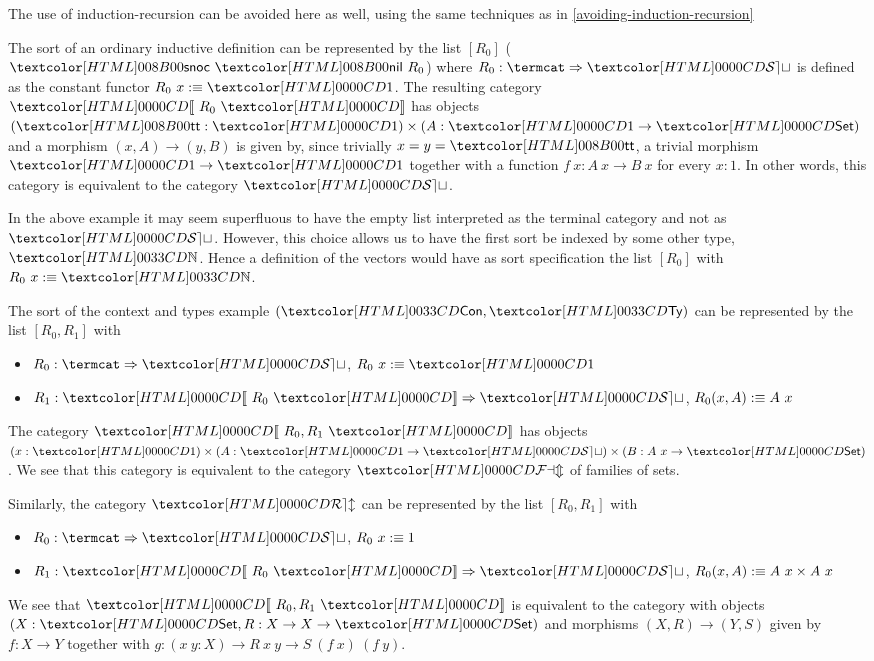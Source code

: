 \begin{remark}
  The use of induction-recursion can be avoided here as well, using
  the same techniques as in \cref{avoiding-induction-recursion}
\end{remark}

\begin{example}
  The sort of an ordinary inductive definition can be represented by
  the list $[R_0]$ (\ie $\sortssnoc\ \sortsnil\ R_0$) where
  $R_0 : \Func{\termcat}{\SET}$ is defined as the constant functor
  $R_0\ x \ddefeq \unitty$. The resulting category $\SortCat{R_0}$ has
  objects $(\unitval : \unitty) \times (A : \unitty \to \Set)$ and a
  morphism $(x, A) \to (y, B)$ is given by, since trivially
  $x = y = \unitval$, a trivial morphism $\unitty \to \unitty$
  together with a function $f\ x : A\ x \to B\ x$ for every $x : 1$. In
  other words, this category is equivalent to the category $\SET$.
\end{example}

In the above example it may seem superfluous to have the empty list
interpreted as the terminal category and not as $\SET$. However, this
choice allows us to have the first sort be indexed by some other type,
\eg $\natty$. Hence a definition of the vectors would have as sort
specification the list $[R_0]$ with $R_0\ x \ddefeq \natty$.

\begin{example}
  The sort of the context and types example $(\ttconty, \tttyty)$ can be
  represented by the list $[R_0, R_1]$ with
  \begin{itemize}
  \item $R_0 : \Func{\termcat}{\SET}$, $R_0\ x \ddefeq \unitty$
  \item $R_1 : \Func{\SortCat{R_0}}{\SET}$, $R_0 (x, A) :\equiv A\ x$
  \end{itemize}
  The category $\SortCat{R_0,R_1}$ has objects
  $(x : \unitty) \times (A : \unitty \to \SET) \times (B : A\ x \to
  \Set)$.
  We see that this category is equivalent to the category $\FAM$ of
  families of sets.
\end{example}

\begin{example}
  \label{rel-sorts}
  Similarly, the category $\REL$ can be represented by the list
  $[R_0, R_1]$ with
  \begin{itemize}
  \item $R_0 : \Func{\termcat}{\SET}$, $R_0\ x :\equiv 1$
  \item $R_1 : \Func{\SortCat{R_0}}{\SET}$, $R_0 (x, A) :\equiv A\ x \times A\ x$
  \end{itemize}
  We see that $\SortCat{R_0,R_1}$ is equivalent to the category with
  objects $(X : \Set, R : X \to X \to \Set)$ and morphisms
  $(X,R) \to (Y,S)$ given by $f : X \to Y$ together with
  $g : (x\ y: X) \to R\ x\ y \to S\ (f\ x)\ (f\ y)$.
\end{example}

